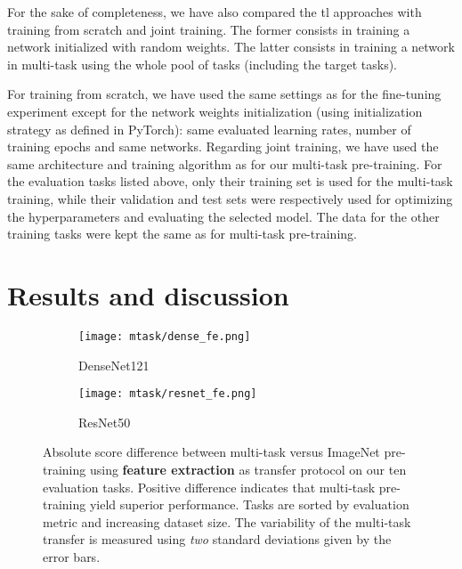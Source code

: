 For the sake of completeness, we have also compared the \acrlong{tl} approaches with training from scratch and joint training. The former consists in training a network initialized with random weights. The latter consists in training a network in multi-task using the whole pool of tasks (including the target tasks). 

For training from scratch, we have used the same settings as for the fine-tuning experiment except for the network weights initialization (using initialization strategy as defined in PyTorch): same evaluated learning rates, number of training epochs and same networks. Regarding joint training, we have used the same architecture and training algorithm as for our multi-task pre-training. For the evaluation tasks listed above, only their training set is used for the multi-task training, while their validation and test sets were respectively used for optimizing the hyperparameters and evaluating the selected model. The data for the other training tasks were kept the same as for multi-task pre-training.

\section{Results and discussion}
\label{sec:mtask:results}
\begin{figure}[t]
    \center
    \begin{subfigure}[t]{0.70\textwidth}
        \centering
        \texttt{[image: mtask/dense\_fe.png]}
        \caption{DenseNet121}
    \end{subfigure}    
    \begin{subfigure}[t]{0.70\textwidth}
        \centering
        \texttt{[image: mtask/resnet\_fe.png]}
        \caption{ResNet50}
    \end{subfigure}    
    \caption{Absolute score difference between multi-task versus ImageNet pre-training using \textbf{feature extraction} as transfer protocol on our ten evaluation tasks. Positive difference indicates that multi-task pre-training yield superior performance. Tasks are sorted by evaluation metric and increasing dataset size. The variability of the multi-task transfer is measured using \textit{two} standard deviations given by the error bars.}  
    \label{fig:mtask:res_featext}
\end{figure}

